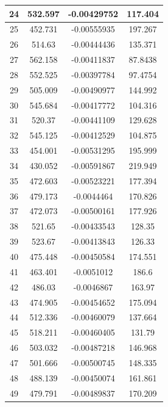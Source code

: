 \begin{table}[h]
{\begin{tabular}{|c|c|c|c|}
24   &   532.597   &   -0.00429752   &   117.404  \\  \hline  
25   &   452.731   &   -0.00555935   &   197.267  \\  \hline  
26   &   514.63   &   -0.00444436   &   135.371  \\  \hline  
27   &   562.158   &   -0.00411837   &   87.8438  \\  \hline  
28   &   552.525   &   -0.00397784   &   97.4754  \\  \hline  
29   &   505.009   &   -0.00490977   &   144.992  \\  \hline  
30   &   545.684   &   -0.00417772   &   104.316  \\  \hline  
31   &   520.37   &   -0.00441109   &   129.628  \\  \hline  
32   &   545.125   &   -0.00412529   &   104.875  \\  \hline  
33   &   454.001   &   -0.00531295   &   195.999  \\  \hline  
34   &   430.052   &   -0.00591867   &   219.949  \\  \hline  
35   &   472.603   &   -0.00523221   &   177.394  \\  \hline  
36   &   479.173   &   -0.0044464   &   170.826  \\  \hline  
37   &   472.073   &   -0.00500161   &   177.926  \\  \hline  
38   &   521.65   &   -0.00433543   &   128.35  \\  \hline  
39   &   523.67   &   -0.00413843   &   126.33  \\  \hline  
40   &   475.448   &   -0.00450584   &   174.551  \\  \hline  
41   &   463.401   &   -0.0051012   &   186.6  \\  \hline  
42   &   486.03   &   -0.0046867   &   163.97  \\  \hline  
43   &   474.905   &   -0.00454652   &   175.094  \\  \hline  
44   &   512.336   &   -0.00460079   &   137.664  \\  \hline  
45   &   518.211   &   -0.00460405   &   131.79  \\  \hline  
46   &   503.032   &   -0.00487218   &   146.968  \\  \hline  
47   &   501.666   &   -0.00500745   &   148.335  \\  \hline  
48   &   488.139   &   -0.00450074   &   161.861  \\  \hline  
49   &   479.791   &   -0.00489837   &   170.209  \\  \hline  

\end{tabular}}
\end{table}
